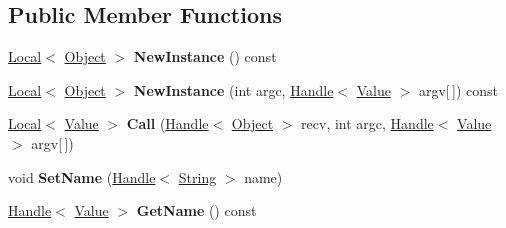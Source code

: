 \subsection*{Public Member Functions}
\begin{DoxyCompactItemize}
\item 
\hypertarget{classv8_1_1_function_a2bbac81200b840cbd484679aaa5b03d4}{}\hyperlink{classv8_1_1_local}{Local}$<$ \hyperlink{classv8_1_1_object}{Object} $>$ {\bfseries New\+Instance} () const \label{classv8_1_1_function_a2bbac81200b840cbd484679aaa5b03d4}

\item 
\hypertarget{classv8_1_1_function_a1261371c01bf18be5564f290af22e9d9}{}\hyperlink{classv8_1_1_local}{Local}$<$ \hyperlink{classv8_1_1_object}{Object} $>$ {\bfseries New\+Instance} (int argc, \hyperlink{classv8_1_1_handle}{Handle}$<$ \hyperlink{classv8_1_1_value}{Value} $>$ argv\mbox{[}$\,$\mbox{]}) const \label{classv8_1_1_function_a1261371c01bf18be5564f290af22e9d9}

\item 
\hypertarget{classv8_1_1_function_a168c16f181c5d5ff9ebe7db952c12b04}{}\hyperlink{classv8_1_1_local}{Local}$<$ \hyperlink{classv8_1_1_value}{Value} $>$ {\bfseries Call} (\hyperlink{classv8_1_1_handle}{Handle}$<$ \hyperlink{classv8_1_1_object}{Object} $>$ recv, int argc, \hyperlink{classv8_1_1_handle}{Handle}$<$ \hyperlink{classv8_1_1_value}{Value} $>$ argv\mbox{[}$\,$\mbox{]})\label{classv8_1_1_function_a168c16f181c5d5ff9ebe7db952c12b04}

\item 
\hypertarget{classv8_1_1_function_a5e244ce13d6f30ffa69f520126ada795}{}void {\bfseries Set\+Name} (\hyperlink{classv8_1_1_handle}{Handle}$<$ \hyperlink{classv8_1_1_string}{String} $>$ name)\label{classv8_1_1_function_a5e244ce13d6f30ffa69f520126ada795}

\item 
\hypertarget{classv8_1_1_function_adbbf95a036859381c06af3d05cd74b07}{}\hyperlink{classv8_1_1_handle}{Handle}$<$ \hyperlink{classv8_1_1_value}{Value} $>$ {\bfseries Get\+Name} () const \label{classv8_1_1_function_adbbf95a036859381c06af3d05cd74b07}


\end{DoxyCompactItemize}
